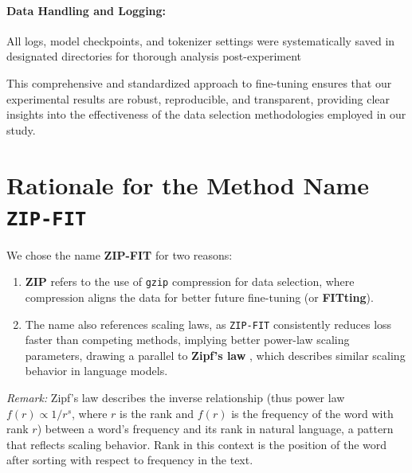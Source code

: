 \paragraph{Data Handling and Logging:}
All logs, model checkpoints, and tokenizer settings were systematically saved in designated directories for thorough analysis post-experiment

This comprehensive and standardized approach to fine-tuning ensures that our experimental results are robust, reproducible, and transparent, providing clear insights into the effectiveness of the data selection methodologies employed in our study.

\section{Rationale for the Method Name \texttt{ZIP-FIT}}

We chose the name \textbf{ZIP-FIT} for two reasons:
\begin{enumerate}
    \item \textbf{ZIP} refers to the use of \texttt{gzip} compression for data selection, where compression aligns the data for better future fine-tuning (or \textbf{FITting}).
    \item The name also references scaling laws, as \texttt{ZIP-FIT} consistently reduces loss faster than competing methods, implying better power-law scaling parameters, drawing a parallel to \textbf{Zipf's law} \cite{piantadosi2014zipf}, which describes similar scaling behavior in language models.
\end{enumerate}

\textit{Remark:} Zipf's law \cite{piantadosi2014zipf} describes the inverse relationship (thus power law $f(r) \propto 1/r^s$, where $r$ is the rank and $f(r)$ is the frequency of the word with rank $r$) between a word's frequency and its rank in natural language, a pattern that reflects scaling behavior. 
Rank in this context is the position of the word after sorting with respect to frequency in the text.

\newpage

